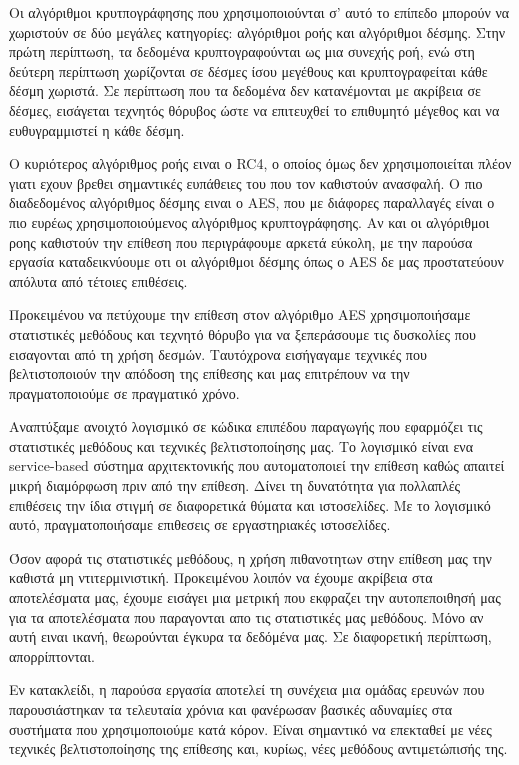 Οι αλγόριθμοι κρυτπογράφησης που χρησιμοποιούνται σ' αυτό το επίπεδο μπορούν να
χωριστούν σε δύο μεγάλες κατηγορίες: αλγόριθμοι ροής και αλγόριθμοι δέσμης.
Στην πρώτη περίπτωση, τα δεδομένα κρυπτογραφούνται ως μια συνεχής ροή,  ενώ στη 
δεύτερη περίπτωση χωρίζονται σε δέσμες ίσου μεγέθους και κρυπτογραφείται κάθε δέσμη χωριστά. 
Σε περίπτωση που τα δεδομένα δεν κατανέμονται με ακρίβεια σε δέσμες, εισάγεται τεχνητός
θόρυβος ώστε να επιτευχθεί το επιθυμητό μέγεθος και να ευθυγραμμιστεί η κάθε δέσμη.

Ο κυριότερος αλγόριθμος ροής ειναι ο RC4, ο οποίος όμως δεν χρησιμοποιείται πλέον
γιατι εχουν βρεθει σημαντικές ευπάθειες του που τον καθιστούν ανασφαλή. Ο πιο
διαδεδομένος αλγόριθμος δέσμης ειναι ο AES, που με διάφορες παραλλαγές είναι ο
πιο ευρέως χρησιμοποιούμενος αλγόριθμος κρυπτογράφησης. Αν και οι αλγόριθμοι ροης
καθιστούν την επίθεση που περιγράφουμε αρκετά εύκολη, με την παρούσα εργασία
καταδεικνύουμε οτι οι αλγόριθμοι δέσμης όπως ο AES δε μας προστατεύουν απόλυτα από
τέτοιες επιθέσεις. 

Προκειμένου να πετύχουμε την επίθεση στον αλγόριθμο AES χρησιμοποιήσαμε στατιστικές
μεθόδους και τεχνητό θόρυβο για να ξεπεράσουμε τις δυσκολίες που εισαγονται από τη
χρήση δεσμών. Ταυτόχρονα εισήγαγαμε τεχνικές που βελτιστοποιούν την απόδοση της
επίθεσης και μας επιτρέπουν να την πραγματοποιούμε σε πραγματικό χρόνο.

Αναπτύξαμε ανοιχτό λογισμικό σε κώδικα επιπέδου παραγωγής που εφαρμόζει τις στατιστικές
μεθόδους και τεχνικές βελτιστοποίησης μας. Το λογισμικό είναι ενα service-based σύστημα
αρχιτεκτονικής που αυτοματοποιεί την επίθεση καθώς απαιτεί μικρή διαμόρφωση πριν από την
επίθεση. Δίνει τη δυνατότητα για πολλαπλές επιθέσεις την ίδια στιγμή σε διαφορετικά θύματα
και ιστοσελίδες. Με το λογισμικό αυτό, πραγματοποιήσαμε επιθεσεις σε εργαστηριακές ιστοσελίδες.

Όσον αφορά τις στατιστικές μεθόδους, η χρήση πιθανοτητων στην επίθεση μας την καθιστά μη
ντιτερμινιστική. Προκειμένου λοιπόν να έχουμε ακρίβεια στα αποτελέσματα μας, έχουμε εισάγει
μια μετρική που εκφραζει την αυτοπεποιθησή μας για τα αποτελέσματα που παραγονται απο
τις στατιστικές μας μεθόδους. Μόνο αν αυτή ειναι ικανή, θεωρούνται έγκυρα τα δεδόμένα μας.
Σε διαφορετική περίπτωση, απορρίπτονται.


Εν κατακλείδι, η παρούσα εργασία αποτελεί τη συνέχεια μια ομάδας ερευνών που
παρουσιάστηκαν τα τελευταία χρόνια και φανέρωσαν βασικές αδυναμίες στα
συστήματα που χρησιμοποιούμε κατά κόρον. Είναι σημαντικό να επεκταθεί με νέες
τεχνικές βελτιστοποίησης της επίθεσης και, κυρίως, νέες μεθόδους αντιμετώπισής
της.

